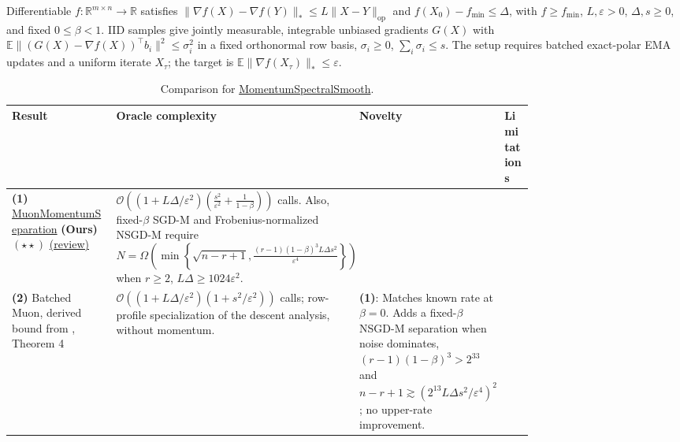 \begin{table}[tp]
\centering
\caption{Comparison for \href{https://github.com/k3nfalt/longtails/blob/main/LongTails/Setups/MomentumSpectralSmooth.lean}{MomentumSpectralSmooth}.}\label{tab:MomentumSpectralSmooth}
\parbox{\linewidth}{\footnotesize Differentiable $f:\mathbb R^{m\times n}\to\mathbb R$ satisfies $\|\nabla f(X)-\nabla f(Y)\|_*\le L\|X-Y\|_{\mathrm{op}}$ and $f(X_0)-f_{\min}\le\Delta$, with $f\ge f_{\min}$, $L,\varepsilon>0$, $\Delta,s\ge0$, and fixed $0\le\beta<1$. IID samples give jointly measurable, integrable unbiased gradients $G(X)$ with $\mathbb E\|(G(X)-\nabla f(X))^\top b_i\|^2\le\sigma_i^2$ in a fixed orthonormal row basis, $\sigma_i\ge0$, $\sum_i\sigma_i\le s$. The setup requires batched exact-polar EMA updates and a uniform iterate $X_\tau$; the target is $\mathbb E\|\nabla f(X_\tau)\|_*\le\varepsilon$.}\par\smallskip
\begin{threeparttable}
\footnotesize
\setlength{\tabcolsep}{4pt}\renewcommand{\arraystretch}{1.25}
\begin{tabularx}{\linewidth}{@{}>{\raggedright\arraybackslash}p{0.20\linewidth}>{\raggedright\arraybackslash}p{0.32\linewidth}>{\raggedright\arraybackslash}p{0.25\linewidth}>{\raggedright\arraybackslash}X@{}}
\toprule
\textbf{Result} & \textbf{Oracle complexity} & \textbf{Novelty} & \textbf{Limitations} \\
\midrule
\textbf{(1)} \href{https://github.com/k3nfalt/longtails/blob/main/LongTails/Theorems/MuonMomentumSeparation.lean}{Muon\allowbreak Momentum\allowbreak Separation} \textbf{(Ours)} $(\star\star)$ \href{https://github.com/k3nfalt/longtails/blob/main/scripts/reviews/MuonMomentumSeparation.md}{(review)}
& $\mathcal{O}\!\left((1+L\Delta/\varepsilon^2)\left(\frac{s^2}{\varepsilon^2}+\frac1{1-\beta}\right)\right)$ calls.
Also, fixed-$\beta$ SGD-M and Frobenius-normalized NSGD-M require
$N=\Omega\!\left(\min\!\left\{\sqrt{n-r+1},\frac{(r-1)(1-\beta)^3L\Delta s^2}{\varepsilon^4}\right\}\right)$
when $r\ge2$, $L\Delta\ge1024\varepsilon^2$.
& & \\
\midrule[1.2pt]
\textbf{(2)} Batched Muon, derived bound from \citep{momentumTYZ2026v1}, Theorem 4
& $\mathcal{O}\!\left((1+L\Delta/\varepsilon^2)(1+s^2/\varepsilon^2)\right)$ calls; row-profile specialization of the descent analysis, without momentum.
& \textbf{(1)}: Matches known rate at $\beta=0$. Adds a fixed-$\beta$ NSGD-M separation when noise dominates, $(r-1)(1-\beta)^3>2^{33}$ and $n-r+1\gtrsim(2^{13}L\Delta s^2/\varepsilon^4)^2$; no upper-rate improvement.

\end{tabularx}
\end{threeparttable}
\end{table}
